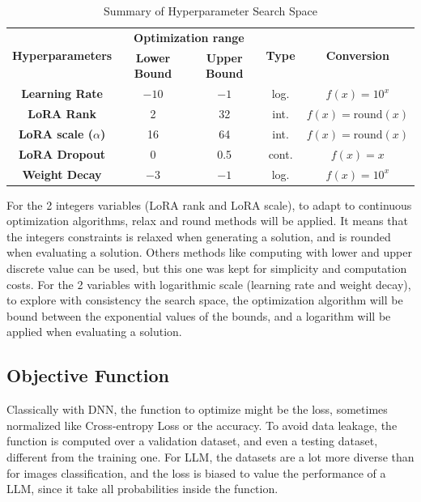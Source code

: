 \documentclass[runningheads]{llncs}
\begin{document}
\vspace*{-\baselineskip}
\begin{table}[h]
    \centering
    \begin{tabular}{|c|c|c|c|c|}
        \hline
        \multirow{2}{*}{\textbf{ Hyperparameters }} & \multicolumn{2}{|c|}{\textbf{Optimization range}} &\multirow{2}{*}{\textbf{ Type }}& \multirow{2}{*}{\textbf{ Conversion }} \\
        \cline{2-3}
         & \textbf{ Lower Bound } & \textbf{ Upper Bound } & & \\
        \hline
        \textbf{Learning Rate} & $-10$ & $-1$ & log. & $f(x) = 10^{x}$ \\
        \hline
        \textbf{LoRA Rank} & 2 & 32 &int. &$f(x) = \text{round}(x)$ \\
        \hline
        \textbf{LoRA scale ($\alpha$)} & 16 & 64 & int. &$f(x) = \text{round}(x)$ \\
        \hline
        \textbf{LoRA Dropout} & 0 & 0.5 & cont.& $f(x) = x$ \\
        \hline
        \textbf{Weight Decay} & $-3$ & $-1$ &log.& $f(x) = 10^{x}$  \\
        \hline
    \end{tabular}
    \caption{Summary of Hyperparameter Search Space}
    \label{tab:hyperparam_table}
\end{table}\vspace*{-\baselineskip}

For the 2 integers variables (LoRA rank and LoRA scale), to adapt to continuous optimization algorithms, relax and round methods will be applied. It means that the integers constraints is relaxed when generating a solution, and is rounded when evaluating a solution. Others methods like computing with lower and upper discrete value can be used, but this one was kept for simplicity and computation costs.
For the 2 variables with logarithmic scale (learning rate and weight decay), to explore with consistency the search space, the optimization algorithm will be bound between the exponential values of the bounds, and a logarithm will be applied when evaluating a solution.


\subsection{Objective Function}
\label{sec:obj_fun}
Classically with DNN, the function to optimize might be the loss, sometimes normalized like Cross-entropy Loss or the accuracy. To avoid data leakage, the function is computed over a validation dataset, and even a testing dataset, different from the training one. For LLM, the datasets are a lot more diverse than for images classification, and the loss is biased to value the performance of a LLM, since it take all probabilities inside the function. 
\end{document}
